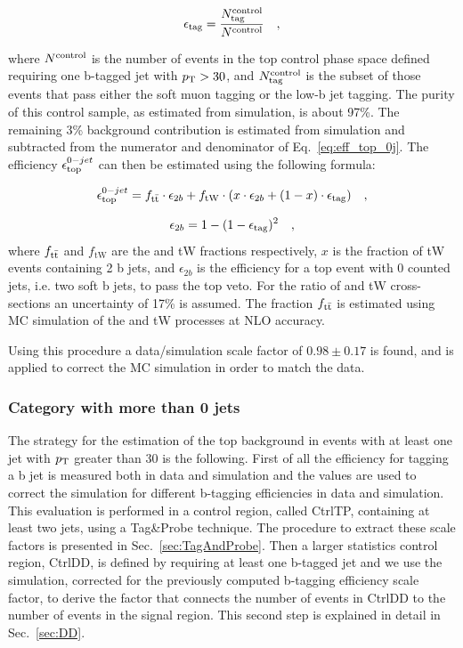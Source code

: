 \begin{equation}\label{eq:eff_top_0j}
\epsilon_{\rm tag} = \frac{N_{\rm tag}^{\rm control}}{N^{\rm control}} \quad ,
\end{equation}

where $N^{\rm control}$ is the number of events in the top control phase space defined requiring one b-tagged jet with $p_\mathrm{T}>30$\GeV, and $N_{\rm tag}^{\rm control}$ is the subset of those events that pass either the soft muon tagging or the low-\pt b jet tagging. The purity of this control sample, as estimated from simulation, is about 97\%. The remaining 3\% background contribution is estimated from simulation and subtracted from the numerator and denominator of Eq.~\eqref{eq:eff_top_0j}. The efficiency $\epsilon_{\rm top}^{0-jet}$ can then be estimated using the following formula:

\begin{equation}\label{eq:eff_top_0j}
\epsilon_{\rm top}^{0-jet} = f_{\mathrm{t}\bar{\mathrm{t}}} \cdot \epsilon_{2b} + f_\mathrm{tW} \cdot ( x \cdot \epsilon_{2b} + (1-x) \cdot \epsilon_{\rm tag} ) \quad ,
\end{equation}

\begin{equation}
\epsilon_{2b} = 1 - (1 - \epsilon_{\rm tag})^{2} \quad ,
\end{equation}
where $f_{\mathrm{t}\bar{\mathrm{t}}}$ and $f_\mathrm{tW}$ are the \ttbar and tW fractions respectively, $x$ is the fraction of tW events containing 2 b jets, and $\epsilon_{2b}$ is the efficiency for a top event with 0 counted jets, i.e. two soft b jets, to pass the top veto. For the ratio of \ttbar and tW cross-sections an uncertainty of 17\% is assumed. The fraction $f_{\mathrm{t}\bar{\mathrm{t}}}$ is estimated using MC simulation of the \ttbar and tW processes at NLO accuracy.

Using this procedure a data/simulation scale factor of $0.98 \pm 0.17$ is found, and is applied to correct the MC simulation in order to match the data.



\subsubsection{Category with more than 0 jets}
The strategy for the estimation of the top background in events with at least one jet with $p_\mathrm{T}$ greater than 30 \GeV is the following. First of all the efficiency for tagging a b jet is measured both in data and simulation and the values are used to correct the simulation for different b-tagging efficiencies in data and simulation. This evaluation is performed in a control region, called CtrlTP, containing at least two jets, using a Tag\&Probe technique. The procedure to extract these scale factors is presented in Sec.~\ref{sec:TagAndProbe}. Then a larger statistics control region, CtrlDD, is defined by requiring at least one b-tagged jet and we use the simulation, corrected for the previously computed b-tagging efficiency scale factor, to derive the factor that connects the number of events in CtrlDD to the number of events in the signal region. This second step is explained in detail in Sec.~\ref{sec:DD}. 

